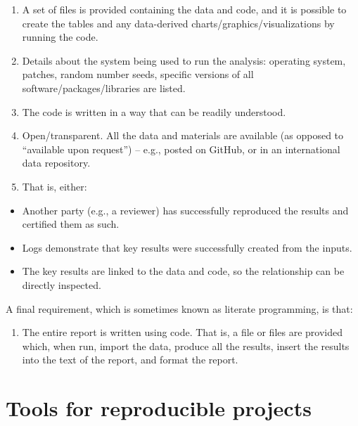 \documentclass[
]{book}
\providecommand{\tightlist}{%
  \setlength{\itemsep}{0pt}\setlength{\parskip}{0pt}}
\begin{document}
\begin{enumerate}
\def\labelenumi{\alph{enumi})}
\item
  A set of files is provided containing the data and code, and it is possible to create the tables and any data-derived charts/graphics/visualizations by running the code.
\item
  Details about the system being used to run the analysis: operating system, patches, random number seeds, specific versions of all software/packages/libraries are listed.
\item
  The code is written in a way that can be readily understood.
\item
  Open/transparent. All the data and materials are available (as opposed to ``available upon request'') -- e.g., posted on GitHub, or in an international data repository.
\item
  That is, either:
\end{enumerate}

\begin{itemize}
\tightlist
\item
  Another party (e.g., a reviewer) has successfully reproduced the results and certified them as such.\\
\item
  Logs demonstrate that key results were successfully created from the inputs.\\
\item
  The key results are linked to the data and code, so the relationship can be directly inspected.
\end{itemize}

A final requirement, which is sometimes known as literate programming, is that:

\begin{enumerate}
\def\labelenumi{\alph{enumi})}
\setcounter{enumi}{5}
\tightlist
\item
  The entire report is written using code. That is, a file or files are provided which, when run, import the data, produce all the results, insert the results into the text of the report, and format the report.
\end{enumerate}

\hypertarget{tools-for-reproducible-projects}{%
\chapter{Tools for reproducible projects}\label{tools-for-reproducible-projects}}
\end{document}
